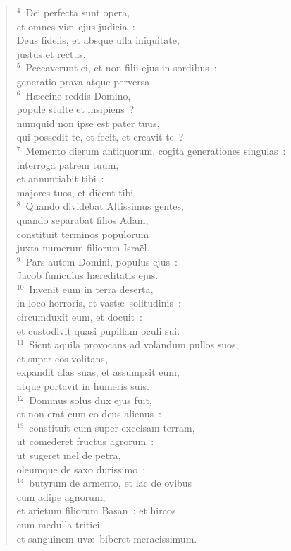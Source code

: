 \begin{flushleft}\begin{verse}${}^{4}$~Dei perfecta sunt opera,\\ et omnes vi\ae\ ejus judicia~:\\ Deus fidelis, et absque ulla iniquitate,\\ justus et rectus.\\
${}^{5}$~Peccaverunt ei, et non filii ejus in sordibus~:\\ generatio prava atque perversa.\\
${}^{6}$~H\ae ccine reddis Domino,\\ popule stulte et insipiens~?\\ numquid non ipse est pater tuus,\\ qui possedit te, et fecit, et creavit te~?\\
${}^{7}$~Memento dierum antiquorum, cogita generationes singulas~:\\ interroga patrem tuum,\\ et annuntiabit tibi~:\\ majores tuos, et dicent tibi.\\
${}^{8}$~Quando dividebat Altissimus gentes,\\ quando separabat filios Adam,\\ constituit terminos populorum\\ juxta numerum filiorum Isra\"el.\\
${}^{9}$~Pars autem Domini, populus ejus~:\\ Jacob funiculus h\ae reditatis ejus.\\
${}^{10}$~Invenit eum in terra deserta,\\ in loco horroris, et vast\ae\ solitudinis~:\\ circumduxit eum, et docuit~:\\ et custodivit quasi pupillam oculi sui.\\
${}^{11}$~Sicut aquila provocans ad volandum pullos suos,\\ et super eos volitans,\\ expandit alas suas, et assumpsit eum,\\ atque portavit in humeris suis.\\
${}^{12}$~Dominus solus dux ejus fuit,\\ et non erat cum eo deus alienus~:\\
${}^{13}$~constituit eum super excelsam terram,\\ ut comederet fructus agrorum~:\\ ut sugeret mel de petra,\\ oleumque de saxo durissimo~;\\
${}^{14}$~butyrum de armento, et lac de ovibus\\ cum adipe agnorum,\\ et arietum filiorum Basan~: et hircos\\ cum medulla tritici,\\ et sanguinem uv\ae\ biberet meracissimum.\end{verse}\end{flushleft}


